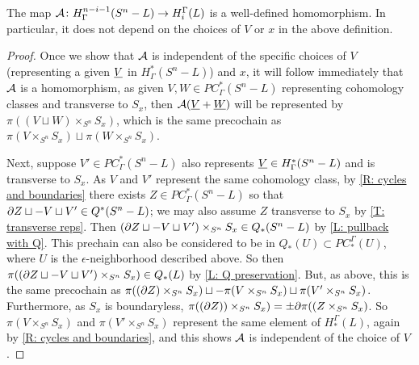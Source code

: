 \begin{proposition}
	The map $\mathcal{A} \colon H^{n-i-1}_\Gamma(S^n-L) \to H_i^\Gamma(L)$ is a well-defined homomorphism.
	In particular, it does not depend on the choices of $V$ or $x$ in the above definition.
\end{proposition}
\begin{proof}
	Once we show that $\mathcal{A}$ is independent of the specific choices of $V$ (representing a given $\underline{V}$ in $H^*_\Gamma(S^n-L)$) and $x$, it will follow immediately that $\mathcal{A}$ is a homomorphism, as given $V,W\in PC^*_\Gamma(S^n-L)$ representing cohomology classes and transverse to $S_x$, then $\mathcal{A}(\underline{V} + \underline{W})$ will be represented by $\pi((V \sqcup W) \times_{S^n} S_x)$, which is the same precochain as $\pi(V \times_{S^n} S_x) \sqcup \pi(W \times_{S^n} S_x)$.

	Next, suppose $V' \in PC^*_\Gamma(S^n-L)$ also represents $\underline{V} \in H^*_\Gamma(S^n-L)$ and is transverse to $S_x$.
	As $V$ and $V'$ represent the same cohomology class, by \cref{R: cycles and boundaries} there exists $Z \in PC^*_\Gamma(S^n-L)$ so that $\partial Z\sqcup -V \sqcup V' \in Q^*(S^n-L)$; we may also assume $Z$ transverse to $S_x$ by \cref{T: transverse reps}.
	Then $(\partial Z \sqcup -V \sqcup V') \times_{S^n} S_x \in Q_*(S^n-L)$ by \cref{L: pullback with Q}.
	This prechain can also be considered to be in $Q_*(U) \subset PC_*^\Gamma(U)$, where $U$ is the $\epsilon$-neighborhood described above.
	So then $\pi((\partial Z \sqcup -V \sqcup V') \times_{S^n} S_x ) \in Q_*(L)$ by \cref{L: Q preservation}.
	But, as above, this is the same precochain as $\pi((\partial Z) \times_{S^n} S_x ) \sqcup -\pi(V \times_{S^n} S_x) \sqcup \pi(V' \times_{S^n} S_x)$.
	Furthermore, as $S_x$ is boundaryless, $\pi((\partial Z)) \times_{S^n} S_x) = \pm \partial \pi((Z \times_{S^n} S_x)$.
	So $\pi(V \times_{S^n} S_x)$ and $\pi(V' \times_{S^n} S_x)$ represent the same element of $H_*^\Gamma(L)$, again by \cref{R: cycles and boundaries}, and this shows $\mathcal{A}$ is independent of the choice of $V$.


\end{proof}
